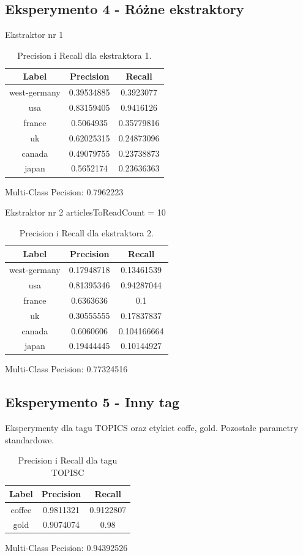 \documentclass{classrep}
\begin{document}
\subsection{Eksperymento 4 - Różne ekstraktory}
Ekstraktor nr 1
\begin{table}[H]
\begin{tabular}{|c|c|c|}
\hline
Label        & Precision  & Recall     \\ \hline
west-germany & 0.39534885 & 0.3923077  \\ \hline
usa          & 0.83159405 & 0.9416126  \\ \hline
france       & 0.5064935  & 0.35779816 \\ \hline
uk           & 0.62025315 & 0.24873096 \\ \hline
canada       & 0.49079755 & 0.23738873 \\ \hline
japan        & 0.5652174  & 0.23636363 \\ \hline
\end{tabular}
\caption{Precision i Recall dla ekstraktora 1.}
\end{table}
Multi-Class Pecision: 0.7962223

Ekstraktor nr 2
articlesToReadCount = 10
\begin{table}[H]
\begin{tabular}{|c|c|c|}
\hline
Label        & Precision  & Recall      \\ \hline
west-germany & 0.17948718 & 0.13461539  \\ \hline
usa          & 0.81395346 & 0.94287044  \\ \hline
france       & 0.6363636  & 0.1         \\ \hline
uk           & 0.30555555 & 0.17837837  \\ \hline
canada       & 0.6060606  & 0.104166664 \\ \hline
japan        & 0.19444445 & 0.10144927  \\ \hline
\end{tabular}
\caption{Precision i Recall dla ekstraktora 2.}
\end{table}
Multi-Class Pecision: 0.77324516

\subsection{Eksperymento 5 - Inny tag}
Eksperymenty dla tagu TOPICS oraz etykiet coffe, gold. Pozostałe parametry standardowe.
\begin{table}[H]
\begin{tabular}{|c|c|c|}
\hline
Label  & Precision & Recall    \\ \hline
coffee & 0.9811321 & 0.9122807 \\ \hline
gold   & 0.9074074 & 0.98      \\ \hline
\end{tabular}
\caption{Precision i Recall dla tagu TOPISC}
\end{table}
Multi-Class Pecision: 0.94392526
\end{document}
